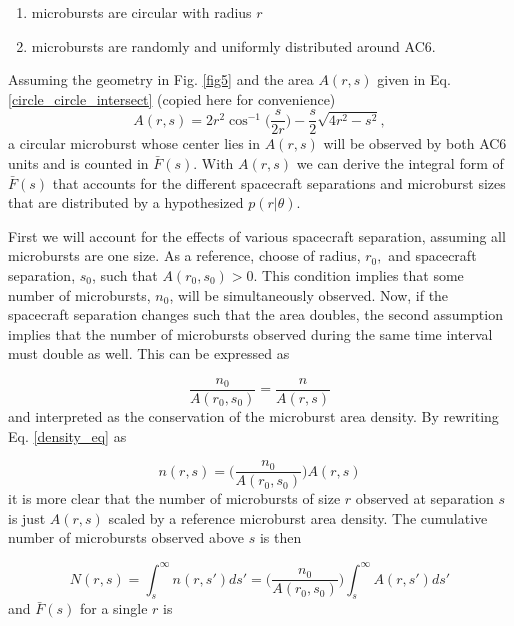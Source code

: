 \documentclass[draft]{agujournal2019}
\begin{document}
\begin{enumerate}
\item microbursts are circular with radius $r$
\item microbursts are randomly and uniformly distributed around AC6.
\end{enumerate} Assuming the geometry in Fig. \ref{fig5} and the area $A(r, s)$ given in Eq. \ref{circle_circle_intersect} (copied here for convenience)
\begin{equation}
A(r, s) = 2r^2 \cos^{-1}{\Big( \frac{s}{2r} \Big)} - \frac{s}{2} \sqrt{4r^2 - s^2},
\end{equation} a circular microburst whose center lies in $A(r, s)$ will be observed by both AC6 units and is counted in $\bar{F}(s)$. With $A(r, s)$ we can derive the integral form of $\bar{F}(s)$ that accounts for the different spacecraft separations and microburst sizes that are distributed by a hypothesized $p(r | \theta)$.

First we will account for the effects of various spacecraft separation, assuming all microbursts are one size. As a reference, choose of radius, $r_0,$ and spacecraft separation, $s_0$, such that $A(r_0, s_0) > 0$. This condition implies that some number of microbursts, $n_0$, will be simultaneously observed. Now, if the spacecraft separation changes such that the area doubles, the second assumption implies that the number of microbursts observed during the same time interval must double as well. This can be expressed as 

\begin{equation} \label{density_eq}
\frac{n_0}{A(r_0, s_0)} = \frac{n}{A(r, s)}
\end{equation} and interpreted as the conservation of the microburst area density. By rewriting Eq. \ref{density_eq} as

\begin{equation}
n(r, s) = \bigg( \frac{n_0}{A(r_0, s_0)} \bigg) A(r, s)
\end{equation} it is more clear that the number of microbursts of size $r$ observed at separation $s$ is just $A(r, s)$ scaled by a reference microburst area density. The cumulative number of microbursts observed above $s$ is then

\begin{equation}
N(r, s) = \int_{s}^\infty n(r, s') ds' = \bigg( \frac{n_0}{A(r_0, s_0)} \bigg) \int_{s}^\infty A(r, s') ds'
\end{equation} and $\bar{F}(s)$ for a single $r$ is
\end{document}
